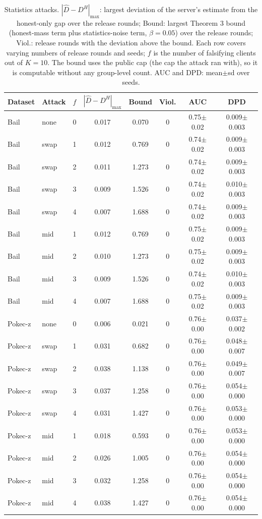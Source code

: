 \begin{table}[tbp]
\centering
\footnotesize
\caption{Statistics attacks. $|\widehat{D}-D^H|_{\max}$: largest deviation of the server's estimate from the honest-only gap over the release rounds; Bound: largest Theorem 3 bound (honest-mass term plus statistics-noise term, $\beta=0.05$) over the release rounds; Viol.: release rounds with the deviation above the bound. Each row covers varying numbers of release rounds and seeds; $f$ is the number of falsifying clients out of $K=10$. The bound uses the public cap (the cap the attack ran with), so it is computable without any group-level count. AUC and DPD: mean$\pm$sd over seeds.}
\label{tab:e4_stat_attacks}
\begin{tabular}{llcccccc}
\toprule
Dataset & Attack & $f$ & $|\widehat{D}-D^H|_{\max}$ & Bound & Viol. & AUC & DPD \\
\midrule
Bail & none & 0 & 0.017 & 0.070 & 0 & 0.75$\pm$0.02 & 0.009$\pm$0.003 \\
Bail & swap & 1 & 0.012 & 0.769 & 0 & 0.74$\pm$0.02 & 0.009$\pm$0.003 \\
Bail & swap & 2 & 0.011 & 1.273 & 0 & 0.74$\pm$0.02 & 0.009$\pm$0.003 \\
Bail & swap & 3 & 0.009 & 1.526 & 0 & 0.74$\pm$0.02 & 0.010$\pm$0.003 \\
Bail & swap & 4 & 0.007 & 1.688 & 0 & 0.74$\pm$0.02 & 0.009$\pm$0.003 \\
Bail & mid & 1 & 0.012 & 0.769 & 0 & 0.75$\pm$0.02 & 0.009$\pm$0.003 \\
Bail & mid & 2 & 0.010 & 1.273 & 0 & 0.75$\pm$0.02 & 0.009$\pm$0.003 \\
Bail & mid & 3 & 0.009 & 1.526 & 0 & 0.74$\pm$0.02 & 0.010$\pm$0.003 \\
Bail & mid & 4 & 0.007 & 1.688 & 0 & 0.75$\pm$0.02 & 0.009$\pm$0.003 \\
Pokec-z & none & 0 & 0.006 & 0.021 & 0 & 0.76$\pm$0.00 & 0.037$\pm$0.002 \\
Pokec-z & swap & 1 & 0.031 & 0.682 & 0 & 0.76$\pm$0.00 & 0.048$\pm$0.007 \\
Pokec-z & swap & 2 & 0.038 & 1.138 & 0 & 0.76$\pm$0.00 & 0.049$\pm$0.007 \\
Pokec-z & swap & 3 & 0.037 & 1.258 & 0 & 0.76$\pm$0.00 & 0.054$\pm$0.000 \\
Pokec-z & swap & 4 & 0.031 & 1.427 & 0 & 0.76$\pm$0.00 & 0.053$\pm$0.000 \\
Pokec-z & mid & 1 & 0.018 & 0.593 & 0 & 0.76$\pm$0.00 & 0.053$\pm$0.000 \\
Pokec-z & mid & 2 & 0.026 & 1.005 & 0 & 0.76$\pm$0.00 & 0.054$\pm$0.000 \\
Pokec-z & mid & 3 & 0.032 & 1.258 & 0 & 0.76$\pm$0.00 & 0.054$\pm$0.000 \\
Pokec-z & mid & 4 & 0.038 & 1.427 & 0 & 0.76$\pm$0.00 & 0.054$\pm$0.000 \\
\bottomrule
\end{tabular}
\end{table}
